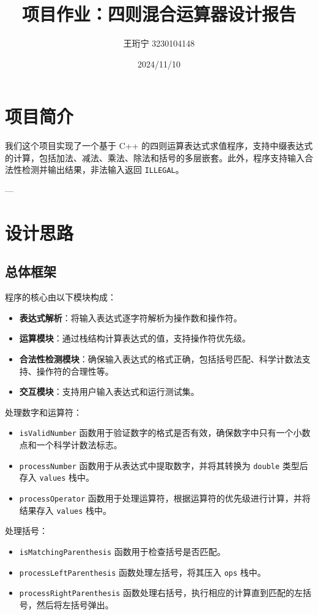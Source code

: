 \documentclass[12pt,a4paper]{article}
\title{项目作业：四则混合运算器设计报告}
\author{王珩宁 3230104148}
\date{2024/11/10}
\begin{document}
\maketitle

\tableofcontents

\newpage

\section{项目简介}
我们这个项目实现了一个基于 C++ 的四则运算表达式求值程序，支持中缀表达式的计算，包括加法、减法、乘法、除法和括号的多层嵌套。此外，程序支持输入合法性检测并输出结果，非法输入返回 \texttt{ILLEGAL}。

---

\section{设计思路}
\subsection{总体框架}
程序的核心由以下模块构成：
\begin{itemize}
    \item \textbf{表达式解析}：将输入表达式逐字符解析为操作数和操作符。
    \item \textbf{运算模块}：通过栈结构计算表达式的值，支持操作符优先级。
    \item \textbf{合法性检测模块}：确保输入表达式的格式正确，包括括号匹配、科学计数法支持、操作符的合理性等。
    \item \textbf{交互模块}：支持用户输入表达式和运行测试集。
\end{itemize}
处理数字和运算符：
\begin{itemize}
    \item \texttt{isValidNumber} 函数用于验证数字的格式是否有效，确保数字中只有一个小数点和一个科学计数法标志。
    \item \texttt{processNumber} 函数用于从表达式中提取数字，并将其转换为 \texttt{double} 类型后存入 \texttt{values} 栈中。
    \item \texttt{processOperator} 函数用于处理运算符，根据运算符的优先级进行计算，并将结果存入 \texttt{values} 栈中。
\end{itemize}

处理括号：
\begin{itemize}
    \item \texttt{isMatchingParenthesis} 函数用于检查括号是否匹配。
    \item \texttt{processLeftParenthesis} 函数处理左括号，将其压入 \texttt{ops} 栈中。
    \item \texttt{processRightParenthesis} 函数处理右括号，执行相应的计算直到匹配的左括号，然后将左括号弹出。
\end{itemize}
\end{document}
